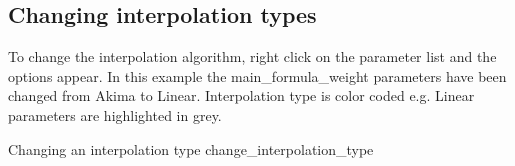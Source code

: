 \subsection{Changing interpolation types}\label{changing-interpolation-types}

To change the interpolation algorithm, right click on the parameter list and the
options appear. In this example the main\_formula\_weight parameters have been
changed from Akima to Linear. Interpolation type is color coded e.g. Linear
parameters are highlighted in grey.

{Changing an interpolation type}
{change_interpolation_type}
